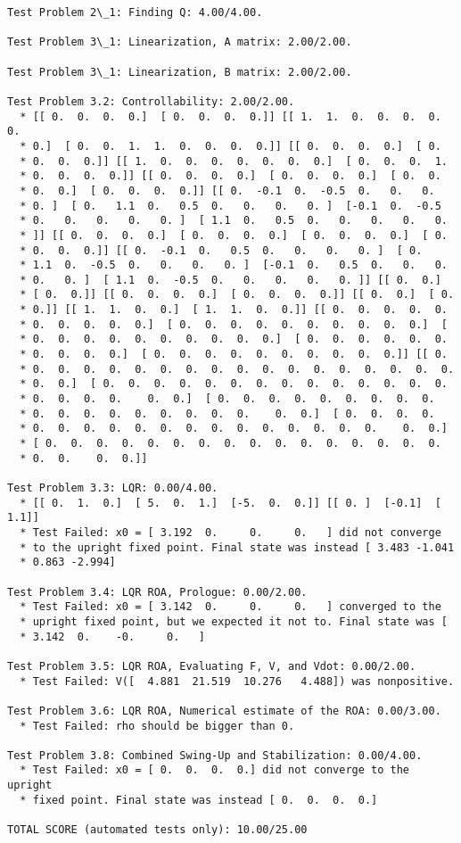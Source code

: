 \documentclass[11pt]{article}
\begin{document}
    \begin{Verbatim}[commandchars=\\\{\}]
Test Problem 2\_1: Finding Q: 4.00/4.00.

Test Problem 3\_1: Linearization, A matrix: 2.00/2.00.

Test Problem 3\_1: Linearization, B matrix: 2.00/2.00.

Test Problem 3.2: Controllability: 2.00/2.00.
  * [[ 0.  0.  0.  0.]  [ 0.  0.  0.  0.]] [[ 1.  1.  0.  0.  0.  0.  0.
  * 0.]  [ 0.  0.  1.  1.  0.  0.  0.  0.]] [[ 0.  0.  0.  0.]  [ 0.
  * 0.  0.  0.]] [[ 1.  0.  0.  0.  0.  0.  0.  0.]  [ 0.  0.  0.  1.
  * 0.  0.  0.  0.]] [[ 0.  0.  0.  0.]  [ 0.  0.  0.  0.]  [ 0.  0.
  * 0.  0.]  [ 0.  0.  0.  0.]] [[ 0.  -0.1  0.  -0.5  0.   0.   0.
  * 0. ]  [ 0.   1.1  0.   0.5  0.   0.   0.   0. ]  [-0.1  0.  -0.5
  * 0.   0.   0.   0.   0. ]  [ 1.1  0.   0.5  0.   0.   0.   0.   0.
  * ]] [[ 0.  0.  0.  0.]  [ 0.  0.  0.  0.]  [ 0.  0.  0.  0.]  [ 0.
  * 0.  0.  0.]] [[ 0.  -0.1  0.   0.5  0.   0.   0.   0. ]  [ 0.
  * 1.1  0.  -0.5  0.   0.   0.   0. ]  [-0.1  0.   0.5  0.   0.   0.
  * 0.   0. ]  [ 1.1  0.  -0.5  0.   0.   0.   0.   0. ]] [[ 0.  0.]
  * [ 0.  0.]] [[ 0.  0.  0.  0.]  [ 0.  0.  0.  0.]] [[ 0.  0.]  [ 0.
  * 0.]] [[ 1.  1.  0.  0.]  [ 1.  1.  0.  0.]] [[ 0.  0.  0.  0.  0.
  * 0.  0.  0.  0.  0.]  [ 0.  0.  0.  0.  0.  0.  0.  0.  0.  0.]  [
  * 0.  0.  0.  0.  0.  0.  0.  0.  0.  0.]  [ 0.  0.  0.  0.  0.  0.
  * 0.  0.  0.  0.]  [ 0.  0.  0.  0.  0.  0.  0.  0.  0.  0.]] [[ 0.
  * 0.  0.  0.  0.  0.  0.  0.  0.  0.  0.  0.  0.  0.  0.  0.  0.  0.
  * 0.  0.]  [ 0.  0.  0.  0.  0.  0.  0.  0.  0.  0.  0.  0.  0.  0.
  * 0.  0.  0.  0.    0.  0.]  [ 0.  0.  0.  0.  0.  0.  0.  0.  0.
  * 0.  0.  0.  0.  0.  0.  0.  0.  0.    0.  0.]  [ 0.  0.  0.  0.
  * 0.  0.  0.  0.  0.  0.  0.  0.  0.  0.  0.  0.  0.  0.    0.  0.]
  * [ 0.  0.  0.  0.  0.  0.  0.  0.  0.  0.  0.  0.  0.  0.  0.  0.
  * 0.  0.    0.  0.]]

Test Problem 3.3: LQR: 0.00/4.00.
  * [[ 0.  1.  0.]  [ 5.  0.  1.]  [-5.  0.  0.]] [[ 0. ]  [-0.1]  [ 1.1]]
  * Test Failed: x0 = [ 3.192  0.     0.     0.   ] did not converge
  * to the upright fixed point. Final state was instead [ 3.483 -1.041
  * 0.863 -2.994]

Test Problem 3.4: LQR ROA, Prologue: 0.00/2.00.
  * Test Failed: x0 = [ 3.142  0.     0.     0.   ] converged to the
  * upright fixed point, but we expected it not to. Final state was [
  * 3.142  0.    -0.     0.   ]

Test Problem 3.5: LQR ROA, Evaluating F, V, and Vdot: 0.00/2.00.
  * Test Failed: V([  4.881  21.519  10.276   4.488]) was nonpositive.

Test Problem 3.6: LQR ROA, Numerical estimate of the ROA: 0.00/3.00.
  * Test Failed: rho should be bigger than 0.

Test Problem 3.8: Combined Swing-Up and Stabilization: 0.00/4.00.
  * Test Failed: x0 = [ 0.  0.  0.  0.] did not converge to the upright
  * fixed point. Final state was instead [ 0.  0.  0.  0.]

TOTAL SCORE (automated tests only): 10.00/25.00


    \end{Verbatim}
\end{document}
